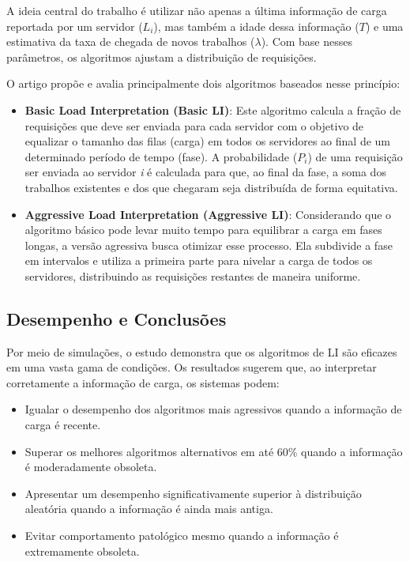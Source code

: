 A ideia central do trabalho é utilizar não apenas a última informação de carga reportada por um servidor ($L_{i}$), mas também a idade dessa informação ($T$) e uma estimativa da taxa de chegada de novos trabalhos ($\lambda$). Com base nesses parâmetros, os algoritmos ajustam a distribuição de requisições.

O artigo propõe e avalia principalmente dois algoritmos baseados nesse princípio:

\begin{itemize}
    \item \textbf{Basic Load Interpretation (Basic LI)}: Este algoritmo calcula a fração de requisições que deve ser enviada para cada servidor com o objetivo de equalizar o tamanho das filas (carga) em todos os servidores ao final de um determinado período de tempo (fase). A probabilidade ($P_{i}$) de uma requisição ser enviada ao servidor \textit{i} é calculada para que, ao final da fase, a soma dos trabalhos existentes e dos que chegaram seja distribuída de forma equitativa.
    \item \textbf{Aggressive Load Interpretation (Aggressive LI)}: Considerando que o algoritmo básico pode levar muito tempo para equilibrar a carga em fases longas, a versão agressiva busca otimizar esse processo. Ela subdivide a fase em intervalos e utiliza a primeira parte para nivelar a carga de todos os servidores, distribuindo as requisições restantes de maneira uniforme.
\end{itemize}

\subsection{Desempenho e Conclusões}

Por meio de simulações, o estudo demonstra que os algoritmos de LI são eficazes em uma vasta gama de condições. Os resultados sugerem que, ao interpretar corretamente a informação de carga, os sistemas podem:
\begin{itemize}
    \item Igualar o desempenho dos algoritmos mais agressivos quando a informação de carga é recente.
    \item Superar os melhores algoritmos alternativos em até 60\% quando a informação é moderadamente obsoleta.
    \item Apresentar um desempenho significativamente superior à distribuição aleatória quando a informação é ainda mais antiga.
    \item Evitar comportamento patológico mesmo quando a informação é extremamente obsoleta.
\end{itemize}

